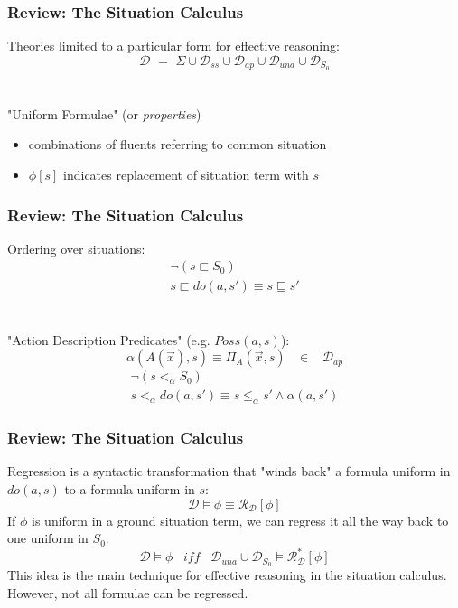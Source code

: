 \documentclass[compress]{beamer}
\begin{document}
\begin{frame}
\frametitle{Review: The Situation Calculus}
Theories limited to a particular form for effective reasoning:
\begin{equation*}
\mathcal{D}\,\,=\,\,\Sigma\cup\mathcal{D}_{ss}\cup\mathcal{D}_{ap}\cup\mathcal{D}_{una}\cup\mathcal{D}_{S_0}
\end{equation*}
\ \\
\ \\
"Uniform Formulae" (or \emph{properties})
\begin{itemize}
 \item combinations of fluents referring to common situation
 \item $\phi[s]$ indicates replacement of situation term with $s$
\end{itemize}

\end{frame}

\begin{frame}
\frametitle{Review: The Situation Calculus}
Ordering over situations:
\begin{gather*}
\neg\left(s \sqsubset S_0\right)\\
s\sqsubset do(a,s')\equiv s\sqsubseteq s'
\end{gather*}
\ \\
\ \\
"Action Description Predicates" (e.g. $Poss(a,s)$):
\begin{equation*}
\alpha(A(\overrightarrow{x}),s) \equiv \Pi_A(\overrightarrow{x},s)\,\,\,\,\,\in\,\,\,\,\,\mathcal{D}_{ap}
\end{equation*}
\begin{gather*}
\neg\left(s <_{\alpha} S_0\right)\\
s <_{\alpha} do(a,s')\equiv s \leq_{\alpha} s' \wedge \alpha(a,s')
\end{gather*}

\end{frame}

\begin{frame}
\frametitle{Review: The Situation Calculus}
Regression is a syntactic transformation that "winds back" a formula
uniform in $do(a,s)$ to a formula uniform in $s$:
\begin{equation*}
\mathcal{D} \models \phi \equiv \mathcal{R}_{\mathcal{D}}[\phi]
\end{equation*}
If $\phi$ is uniform in a ground situation term, we can regress it all the
way back to one uniform in $S_0$:
\begin{equation*}
\mathcal{D} \models \phi\,\,\,\,\,\mathit{iff}\,\,\,\,\,\mathcal{D}_{una}\cup\mathcal{D}_{S_0} \models \mathcal{R}^*_{\mathcal{D}}[\phi]
\end{equation*}
This idea is the main technique for effective reasoning in the situation calculus. However, not all formulae can be regressed.
\end{frame}
\end{document}
